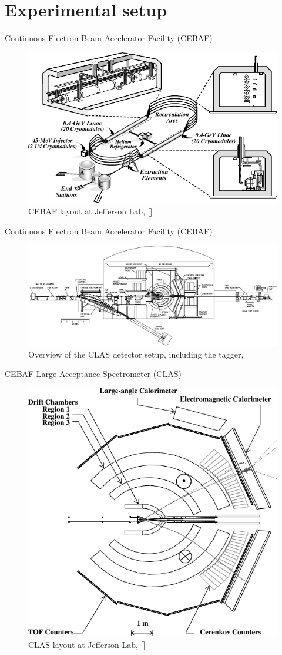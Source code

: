 \documentclass[11pt,aspectratio=1610,dvipsnames]{beamer}
\begin{document}
\section{Experimental setup}
\begin{frame}{Continuous Electron Beam Accelerator Facility (CEBAF)}
	\begin{figure}
		\centering
		\includegraphics[width=.8\linewidth]{cebaf}
		\caption*{CEBAF layout at Jefferson Lab, [\cite{clas}]}
	\end{figure}
\end{frame}


\begin{frame}{Continuous Electron Beam Accelerator Facility (CEBAF)}
	\begin{figure}
			\centering
			\includegraphics[width=\linewidth]{figs/tagger.png}
			\caption*{Overview of the CLAS detector setup, including the tagger, \citet{clas}}
	\end{figure}
\end{frame}


\begin{frame}{CEBAF Large Acceptance Spectrometer (CLAS)}
	\begin{figure}
		\centering
		\includegraphics[width=.5\linewidth]{clas}
		\caption*{CLAS layout at Jefferson Lab, [\cite{clas}]}
	\end{figure}
\end{frame}
\end{document}
